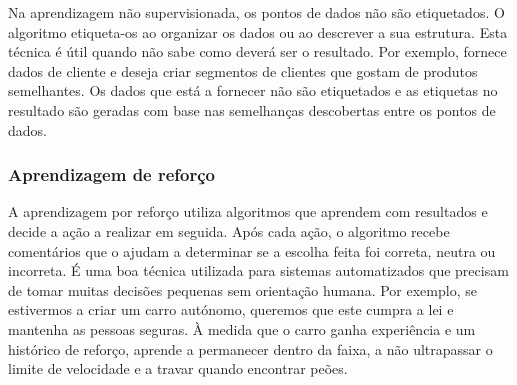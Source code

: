 \documentclass[a4paper,10pt]{article}
\begin{document}
Na aprendizagem não supervisionada, os pontos de dados não são etiquetados.
O algoritmo etiqueta-os ao organizar os dados ou ao descrever a sua estrutura.
Esta técnica é útil quando não sabe como deverá ser o resultado.
Por exemplo, fornece dados de cliente e deseja criar segmentos de clientes que gostam de produtos semelhantes.
Os dados que está a fornecer não são etiquetados e as etiquetas no resultado são geradas com base nas semelhanças descobertas entre os pontos de dados.

\subsubsection{Aprendizagem de reforço}

A aprendizagem por reforço utiliza algoritmos que aprendem com resultados e decide a ação a realizar em seguida.
Após cada ação, o algoritmo recebe comentários que o ajudam a determinar se a escolha feita foi correta, neutra ou incorreta.
É uma boa técnica utilizada para sistemas automatizados que precisam de tomar muitas decisões pequenas sem orientação humana.
Por exemplo, se estivermos a criar um carro autónomo, queremos que este cumpra a lei e mantenha as pessoas seguras.
À medida que o carro ganha experiência e um histórico de reforço, aprende a permanecer dentro da faixa, a não ultrapassar o limite de velocidade e a travar quando encontrar peões.
\end{document}
